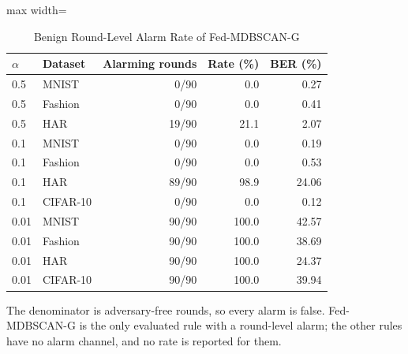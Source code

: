 \begin{table}[!t]
\centering\footnotesize
\setlength{\tabcolsep}{4pt}
\caption{Benign Round-Level Alarm Rate of Fed-MDBSCAN-G}\label{tab:alarm}
\begin{adjustbox}{max width=\columnwidth}
\begin{tabular}{llrrr}
\toprule
$\alpha$ & Dataset & Alarming rounds & Rate (\%) & BER (\%) \\
\midrule
0.5 & MNIST & 0/90 & 0.0 & 0.27 \\
0.5 & Fashion & 0/90 & 0.0 & 0.41 \\
0.5 & HAR & 19/90 & 21.1 & 2.07 \\
0.1 & MNIST & 0/90 & 0.0 & 0.19 \\
0.1 & Fashion & 0/90 & 0.0 & 0.53 \\
0.1 & HAR & 89/90 & 98.9 & 24.06 \\
0.1 & CIFAR-10 & 0/90 & 0.0 & 0.12 \\
0.01 & MNIST & 90/90 & 100.0 & 42.57 \\
0.01 & Fashion & 90/90 & 100.0 & 38.69 \\
0.01 & HAR & 90/90 & 100.0 & 24.37 \\
0.01 & CIFAR-10 & 90/90 & 100.0 & 39.94 \\
\bottomrule
\end{tabular}
\end{adjustbox}

\par\vspace{3pt}\parbox{\linewidth}{\footnotesize The denominator is adversary-free rounds, so every alarm is false. Fed-MDBSCAN-G is the only evaluated rule with a round-level alarm; the other rules have no alarm channel, and no rate is reported for them.}
\end{table}

